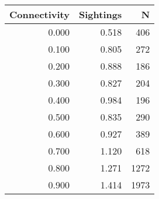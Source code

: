 \begin{tabular}{rrr}
\toprule
 Connectivity &  Sightings &    N \\
\midrule
        0.000 &      0.518 &  406 \\
        0.100 &      0.805 &  272 \\
        0.200 &      0.888 &  186 \\
        0.300 &      0.827 &  204 \\
        0.400 &      0.984 &  196 \\
        0.500 &      0.835 &  290 \\
        0.600 &      0.927 &  389 \\
        0.700 &      1.120 &  618 \\
        0.800 &      1.271 & 1272 \\
        0.900 &      1.414 & 1973 \\
\bottomrule
\end{tabular}
